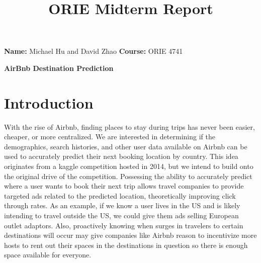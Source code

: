 \documentclass[a4paper, 11pt]{article}
\begin{document}
\noindent\textbf{Name:} Michael Hu and David Zhao \hfill \textbf{Course:} ORIE 4741 \\ 
\begin{center}
\title{ORIE Midterm Report}
\LARGE \bf AirBnb Destination Prediction
\end{center}

\section*{Introduction}
\par
With the rise of Airbnb, finding places to stay during trips has never been easier, cheaper, or more centralized. We are interested in determining if the demographics, search histories, and other user data available on Airbnb can be used to accurately predict their next booking location by country. This idea originates from a kaggle competition hosted in 2014, but we intend to build onto the original drive of the competition. Possessing the ability to accurately predict where a user wants to book their next trip allows travel companies to provide targeted ads related to the predicted location, theoretically improving click through rates. As an example, if we know a user lives in the US and is likely intending to travel outside the US, we could give them ads selling European outlet adaptors. Also, proactively knowing when surges in travelers to certain destinations will occur may give companies like Airbnb reason to incentivize more hosts to rent out their spaces in the destinations in question so there is enough space available for everyone. 
\end{document}
